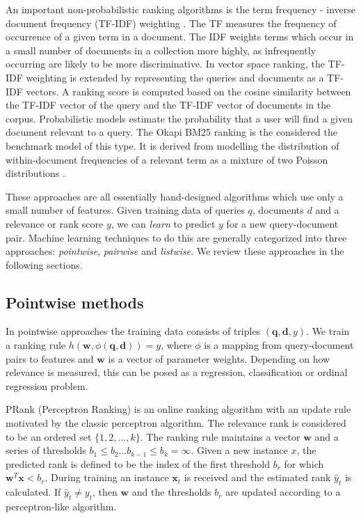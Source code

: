 \documentclass[english]{article}
\theoremstyle{definition}
\begin{document}
\begin{multicols}{2}
An important non-probabilistic ranking algorithms is the term frequency - inverse document frequency (TF-IDF) weighting \cite{tfidf}.  The TF measures the frequency of occurrence of a given term in a document.  The IDF weights terms which occur in a small number of documents in a collection more highly, as infrequently occurring are likely to be more discriminative.  In vector space ranking, the TF-IDF weighting is extended by representing the queries and documents as a TF-IDF vectors.   A ranking score is computed based on the cosine similarity between the TF-IDF vector of the query and the TF-IDF vector of documents in the corpus.  Probabilistic models estimate the probability that a user will find a given document relevant to a query.  The Okapi BM25 ranking is the considered the benchmark model of this type.  It is derived from modelling the distribution of within-document frequencies of a relevant
term as a mixture of two Poisson distributions \cite{robertson1993okapi}.

These approaches are all essentially hand-designed algorithms which use only a small number of features.  Given training data of queries $q$, documents $d$ and a relevance or rank score $y$, we can \textit{learn} to predict $y$ for a new query-document pair.  Machine learning techniques to do this are generally categorized into three approaches: \textit{pointwise}, \textit{pairwise} and \textit{listwise}.  We review these approaches in the following sections.

\subsection{Pointwise methods}

In pointwise approaches the training data consists of triples $(\mathbf{q}, \mathbf{d}, y)$.  We train a ranking rule $h(\mathbf{w}, \phi (\mathbf{q}, \mathbf{d})) = y$, where $\phi$ is a mapping from query-document pairs to features and $\mathbf{w}$ is a vector of parameter weights.  Depending on how relevance is measured, this can be posed as a regression, classification or ordinal regression problem.  

PRank \cite{crammer2001pranking} (Perceptron Ranking) is an online ranking algorithm with an update rule motivated by the classic perceptron algorithm.  The relevance rank is considered to be an ordered set $\{1, 2, \ldots, k \}$.  The ranking rule maintains a vector $\mathbf{w}$ and a series of thresholds $b_1 \le b_2 \ldots b_{k-1} \le b_k = \infty$.  Given a new instance $x$, the predicted rank is defined to be the index of the first threshold $b_r$ for which $\mathbf{w}^T \mathbf{x} < b_r$.  During training an instance $\mathbf{x}_t$ is received and the estimated rank $\hat{y}_t$ is calculated.  If $\hat{y}_t \ne y_t$, then $\mathbf{w}$ and the thresholds $b_r$ are updated according to a perceptron-like algorithm.  


\end{multicols}
\end{document}

